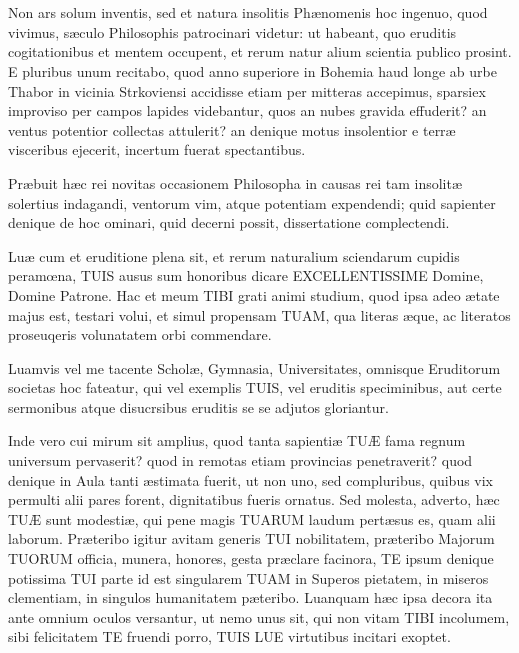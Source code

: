 \documentclass[a4paper, 11pt, oneside, polutonikogreek, latin]{article}
\begin{document}
\section[Dedicatio.]{}
\paragraph{}
Non ars solum inventis, sed et natura insolitis Phænomenis hoc ingenuo, quod vivimus, sæculo Philosophis patrocinari videtur: ut habeant, quo eruditis cogitationibus et mentem occupent, et rerum natur alium scientia publico prosint. E pluribus unum recitabo, quod anno superiore in Bohemia haud longe ab urbe Thabor in vicinia Strkoviensi accidisse etiam per mitteras accepimus, sparsiex improviso per campos lapides videbantur, quos an nubes gravida effuderit? an ventus potentior collectas attulerit? an denique motus insolentior e terræ visceribus ejecerit, incertum fuerat spectantibus.

Præbuit hæc rei novitas occasionem Philosopha in causas rei tam insolitæ solertius indagandi, ventorum vim, atque potentiam expendendi; quid sapienter denique de hoc ominari, quid decerni possit, dissertatione complectendi.

Luæ cum et eruditione plena sit, et rerum naturalium sciendarum cupidis peramœna, TUIS ausus sum honoribus dicare EXCELLENTISSIME Domine, Domine Patrone. Hac et meum TIBI grati animi studium, quod ipsa adeo ætate majus est, testari volui, et simul propensam TUAM, qua literas æque, ac literatos proseuqeris volunatatem orbi commendare.

Luamvis vel me tacente Scholæ, Gymnasia, Universitates, omnisque Eruditorum societas hoc fateatur, qui vel exemplis TUIS, vel eruditis speciminibus, aut certe sermonibus atque disucrsibus eruditis se se adjutos gloriantur.

Inde vero cui mirum sit amplius, quod tanta sapientiæ TUÆ fama regnum universum pervaserit? quod in remotas etiam provincias penetraverit? quod denique in Aula tanti æstimata fuerit, ut non uno, sed compluribus, quibus vix permulti alii pares forent, dignitatibus fueris ornatus. Sed molesta, adverto, hæc TUÆ sunt modestiæ, qui pene magis TUARUM laudum pertæsus es, quam alii laborum. Præteribo igitur avitam generis TUI nobilitatem, præteribo Majorum TUORUM officia, munera, honores, gesta præclare facinora, TE ipsum denique potissima TUI parte id est singularem TUAM in Superos pietatem, in miseros clementiam, in singulos humanitatem pæteribo. Luanquam hæc ipsa decora ita ante omnium oculos versantur, ut nemo unus sit, qui non vitam TIBI incolumem, sibi felicitatem TE fruendi porro, TUIS LUE virtutibus incitari exoptet.
\end{document}
